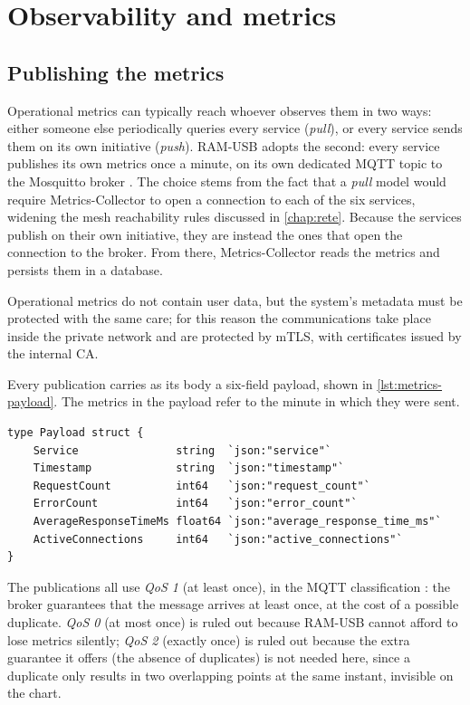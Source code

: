 \chapter{Observability and metrics}
\label{chap:osservabilita}

\section{Publishing the metrics}

Operational metrics can typically reach whoever observes them in two ways: either someone else
periodically queries every service (\emph{pull}), or every service sends them on its own
initiative (\emph{push}).
RAM-USB adopts the second: every service publishes its own metrics once a minute,
on its own dedicated MQTT topic to the Mosquitto broker \cite{mosquitto-github}.
The choice stems from the fact that a \emph{pull} model would require Metrics-Collector to open a
connection to each of the six services, widening the mesh reachability rules discussed in
\autoref{chap:rete}.
Because the services publish on their own initiative, they are instead the ones that open the connection to the broker.
From there, Metrics-Collector reads the metrics and persists them in a database.

Operational metrics do not contain user data, but the system's metadata must be protected with the
same care; for this reason the communications take place inside the private network and are protected by mTLS,
with certificates issued by the internal CA.

Every publication carries as its body a six-field payload, shown in \autoref{lst:metrics-payload}.
The metrics in the payload refer to the minute in which they were sent.

\begin{lstlisting}[caption={Structure of the metrics payload, from \texttt{payload.go}
\cite{ramusb-code-metrics-payload}.}, label={lst:metrics-payload}]
type Payload struct {
	Service               string  `json:"service"`
	Timestamp             string  `json:"timestamp"`
	RequestCount          int64   `json:"request_count"`
	ErrorCount            int64   `json:"error_count"`
	AverageResponseTimeMs float64 `json:"average_response_time_ms"` 
	ActiveConnections     int64   `json:"active_connections"`
}
\end{lstlisting}

The publications all use \emph{QoS 1} (at least once), in the MQTT classification \cite{oasis-mqtt-311}: the
broker guarantees that the message arrives at least once, at the cost of a possible duplicate. \emph{QoS 0}
(at most once) is ruled out because RAM-USB cannot afford to lose metrics silently; \emph{QoS 2}
(exactly once) is ruled out because the extra guarantee it offers (the absence of duplicates) is not needed here,
since a duplicate only results in two overlapping points at the same instant, invisible on the
chart.

